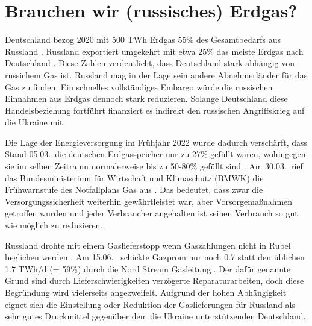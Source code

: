 
\section{Brauchen wir (russisches) Erdgas?}
\label{ch:Introduction}


Deutschland bezog 2020 mit 500 TWh Erdgas 55\% des Gesamtbedarfs aus Russland \cite{clausen2022}. Russland exportiert umgekehrt mit etwa 25\% das meiste Erdgas nach Deutschland \cite{iwd}. 
Diese Zahlen verdeutlicht, dass Deutschland stark abhängig von russichem Gas ist. Russland mag in der Lage sein andere Abnehmerländer für das Gas zu finden. Ein schnelles vollständiges Embargo würde die russischen Einnahmen aus Erdgas dennoch stark reduzieren. Solange Deutschland diese Handelsbeziehung fortführt finanziert es indirekt den russischen Angriffskrieg auf die Ukraine mit.

Die Lage der Energieversorgung im Frühjahr 2022 wurde dadurch verschärft, dass Stand 05.03.~die deutschen Erdgasspeicher nur zu 27\% gefüllt waren, wohingegen sie im selben Zeitraum normalerweise bis zu 50-80\% gefüllt sind \cite{leo}. Am 30.03.~rief das Bundesministerium für Wirtschaft und Klimaschutz (BMWK) die Frühwarnstufe des Notfallplans Gas aus \cite{bmwk}. Das bedeutet, dass zwar die Versorgungssicherheit weiterhin gewährtleistet war, aber Vorsorgemaßnahmen getroffen wurden und jeder Verbraucher angehalten ist seinen Verbrauch so gut wie möglich zu reduzieren.

Russland drohte mit einem Gaslieferstopp wenn Gaszahlungen nicht in Rubel beglichen werden \cite{bmwk}.
Am 15.06.~ schickte Gazprom nur noch 0.7 statt den üblichen 1.7 TWh/d (= 59\%) durch die Nord Stream Gasleitung \cite{gazprom-gasverknappung}. Der dafür genannte Grund sind durch Lieferschwierigkeiten verzögerte Reparaturarbeiten, doch diese Begründung wird vielerseits angezweifelt. Aufgrund der hohen Abhängigkeit eignet sich die Einstellung oder Reduktion der Gaslieferungen für Russland als sehr gutes Druckmittel gegenüber dem die Ukraine unterstützenden Deutschland. 

